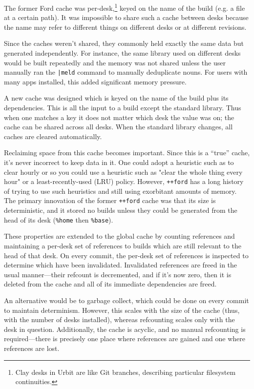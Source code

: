\documentclass[twoside]{article}
\begin{document}
The former Ford cache was per-desk,\footnote{Clay desks in Urbit are like Git branches, describing particular filesystem continuities.} keyed on the name of the build (e.g. a file at a certain path).  It was impossible to share such a cache between desks because the name may refer to different things on different desks or at different revisions.

Since the caches weren't shared, they commonly held exactly the same data but generated independently.  For instance, the same library used on different desks would be built repeatedly and the memory was not shared unless the user manually ran the \lstinline[style=inlinecode]{|meld} command to manually deduplicate nouns.  For users with many apps installed, this added significant memory pressure.

A new cache was designed which is keyed on the name of the build plus its dependencies. This is all the input to a build except the standard library.  Thus when one matches a key it does not matter which desk the value was on; the cache can be shared across all desks.  When the standard library changes, all caches are cleared automatically.

Reclaiming space from this cache becomes important.  Since this is a “true” cache, it's never incorrect to keep data in it.  One could adopt a heuristic such as to clear hourly or so you could use a heuristic such as "clear the whole thing every hour" or a least-recently-used (LRU) policy.  However, \lstinline[style=inlinecode]{++ford} has a long history of trying to use such heuristics and still using exorbitant amounts of memory.  The primary innovation of the former \lstinline[style=inlinecode]{++ford} cache was that its size is deterministic, and it stored no builds unless they could be generated from the head of its desk (\lstinline[style=inlinecode]{%home} then \lstinline[style=inlinecode]{%base}).

These properties are extended to the global cache by counting references and maintaining a per-desk set of references to builds which are still relevant to the head of that desk.  On every commit, the per-desk set of references is inspected to determine which have been invalidated.  Invalidated references are freed in the usual manner—their refcount is decremented, and if it's now zero, then it is deleted from the cache and all of its immediate dependencies are freed.

An alternative would be to garbage collect, which could be done on every commit to maintain determinism.  However, this scales with the size of the cache (thus, with the number of desks installed), whereas refcounting scales only with the desk in question.  Additionally, the cache is acyclic, and no manual refcounting is required—there is precisely one place where references are gained and one where references are lost.
\end{document}
